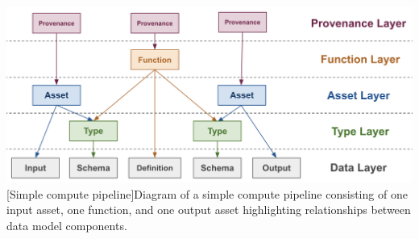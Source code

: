 \documentclass[9pt, oneside]{article}   	%
\begin{document}
\begin{center}
    
\includegraphics[width=1\columnwidth]{pipeline_layers_20230715}
[Simple compute pipeline]{Diagram of a simple compute pipeline consisting of one input asset, one function, and one output asset highlighting relationships between data model components.}
\label{simplePipeline}
\end{center}
\begin{multicols}{2}

{}


\end{multicols}
\end{document}
